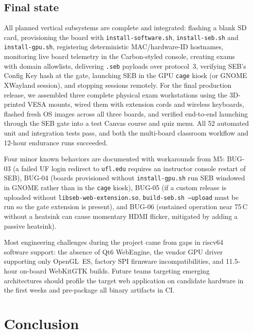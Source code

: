 \documentclass[11pt]{article}
\begin{document}
\subsection{Final state}
All planned vertical subsystems are complete and integrated: flashing a blank SD card, provisioning the board with \texttt{install-software.sh}, \texttt{install-seb.sh} and \texttt{install-gpu.sh}, registering deterministic MAC/hardware-ID hostnames, monitoring live board telemetry in the Carbon-styled console, creating exams with domain allowlists, delivering \texttt{.seb} payloads over protocol~3, verifying SEB's Config Key hash at the gate, launching SEB in the GPU \texttt{cage} kiosk (or GNOME XWayland session), and stopping sessions remotely. For the final production release, we assembled three complete physical exam workstations using the 3D-printed VESA mounts, wired them with extension cords and wireless keyboards, flashed fresh OS images across all three boards, and verified end-to-end launching through the SEB gate into a test Canvas course and quiz menu. All 52 automated unit and integration tests pass, and both the multi-board classroom workflow and 12-hour endurance runs succeeded.

Four minor known behaviors are documented with workarounds from M5: BUG-03 (a failed UF login redirect to \texttt{ufl.edu} requires an instructor console restart of SEB), BUG-04 (boards provisioned without \texttt{install-gpu.sh} run SEB windowed in GNOME rather than in the \texttt{cage} kiosk), BUG-05 (if a custom release is uploaded without \texttt{libseb-web-extension.so}, \texttt{build-seb.sh --upload} must be run so the gate extension is present), and BUG-06 (sustained operation near 75\,\textdegree C without a heatsink can cause momentary HDMI flicker, mitigated by adding a passive heatsink).

Most engineering challenges during the project came from gaps in riscv64 software support: the absence of Qt6 WebEngine, the vendor GPU driver supporting only OpenGL~ES, factory SPI firmware incompatibilities, and 11.5-hour on-board WebKitGTK builds. Future teams targeting emerging architectures should profile the target web application on candidate hardware in the first weeks and pre-package all binary artifacts in CI.

\section{Conclusion}
\end{document}
